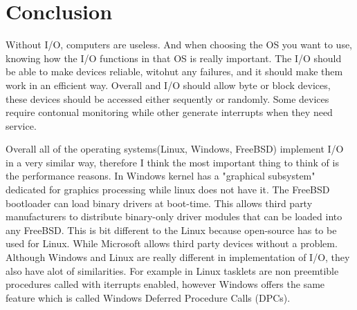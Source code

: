 \documentclass[letterpaper,10pt,draftclsnofoot,onecolumn]{IEEEtran}
\begin{document}
\section*{Conclusion}

Without I/O, computers are useless. And when choosing the OS you want to use, knowing how the I/O functions in that OS is really important. The I/O should be able to make devices reliable, witohut any failures, and it should make them work in an efficient way. Overall and I/O should allow byte or block devices, these devices should be accessed either sequently or randomly. Some devices require contonual monitoring while other generate interrupts when they need service.

Overall all of the operating systems(Linux, Windows, FreeBSD) implement I/O in a very similar way, therefore I think the most important thing to think of is the performance reasons. In Windows kernel has a "graphical subsystem" dedicated for graphics processing while linux does not have it. The FreeBSD bootloader can load binary drivers at boot-time. This allows third party manufacturers to distribute binary-only driver modules that can be loaded into any FreeBSD. This is bit different to the Linux because open-source has to be used for Linux. While Microsoft allows third party devices without a problem. Although Windows and Linux are really different in implementation of I/O, they also have alot of similarities. For example in Linux tasklets are non preemtible procedures called with iterrupts enabled, however Windows offers the same feature which is called Windows Deferred Procedure Calls (DPCs).



\end{document}
